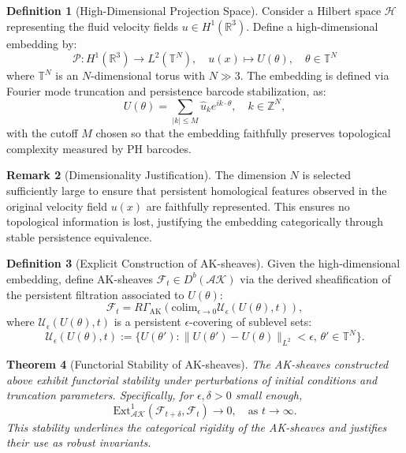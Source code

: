 \documentclass[11pt]{article}
\newtheorem{theorem}{Theorem}[section]
\theoremstyle{definition}
\newtheorem{definition}[theorem]{Definition}
\newtheorem{remark}[theorem]{Remark}
\begin{document}
\begin{definition}[High-Dimensional Projection Space]
Consider a Hilbert space \( \mathcal{H} \) representing the fluid velocity fields \( u \in H^1(\mathbb{R}^3) \). Define a high-dimensional embedding by:
\[
\mathcal{P} : H^1(\mathbb{R}^3) \longrightarrow L^2(\mathbb{T}^N), \quad u(x) \mapsto U(\theta), \quad \theta \in \mathbb{T}^N
\]
where \( \mathbb{T}^N \) is an \( N \)-dimensional torus with \( N \gg 3 \). The embedding is defined via Fourier mode truncation and persistence barcode stabilization, as:
\[
U(\theta) = \sum_{|k|\leq M} \hat{u}_k e^{i k \cdot \theta}, \quad k \in \mathbb{Z}^N,
\]
with the cutoff \( M \) chosen so that the embedding faithfully preserves topological complexity measured by PH barcodes.
\end{definition}

\begin{remark}[Dimensionality Justification]
The dimension \( N \) is selected sufficiently large to ensure that persistent homological features observed in the original velocity field \( u(x) \) are faithfully represented. This ensures no topological information is lost, justifying the embedding categorically through stable persistence equivalence.
\end{remark}

\begin{definition}[Explicit Construction of AK-sheaves]
Given the high-dimensional embedding, define AK-sheaves \( \mathcal{F}_t \in D^b(\mathcal{AK}) \) via the derived sheafification of the persistent filtration associated to \( U(\theta) \):
\[
\mathcal{F}_t = R\Gamma_\mathrm{AK}\left(\mathrm{colim}_{\epsilon \to 0} \mathcal{U}_\epsilon(U(\theta),t)\right),
\]
where \( \mathcal{U}_\epsilon(U(\theta),t) \) is a persistent \( \epsilon \)-covering of sublevel sets:
\[
\mathcal{U}_\epsilon(U(\theta),t) := \{U(\theta') : \|U(\theta') - U(\theta)\|_{L^2} < \epsilon,\,\theta'\in\mathbb{T}^N\}.
\]
\end{definition}

\begin{theorem}[Functorial Stability of AK-sheaves]
The AK-sheaves constructed above exhibit functorial stability under perturbations of initial conditions and truncation parameters. Specifically, for \( \epsilon,\delta > 0 \) small enough,
\[
\mathrm{Ext}^1_{\mathcal{AK}}(\mathcal{F}_{t+\delta},\mathcal{F}_t) \rightarrow 0, \quad \text{as } t\rightarrow\infty.
\]
This stability underlines the categorical rigidity of the AK-sheaves and justifies their use as robust invariants.
\end{theorem}
\end{document}
